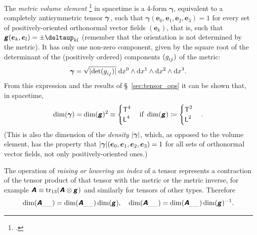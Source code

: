 \documentclass[\ifafour a4paper,12pt,\else a5paper,10pt,\fi%
onecolumn,oneside,article,%
british%
]{memoir}
\makeatletter
\theoremstyle{remark}
\theoremstyle{innote}
\newcommand*{\mathte}[1]{\textbf{\textit{\textsf{#1}}}}
\newcommand*{\citep}{\footcites}
\newcommand*{\delt}{\deltaup}%
\newcommand*{\di}{\mathrm{d}}%
\DeclareMathOperator{\tr}{tr}%
\newcommand*{\defd}{\coloneqq}
\DeclarePairedDelimiter\abs{\lvert}{\rvert}
\renewcommand*{\|}[1][]{\nonscript\,#1\vert\nonscript\;\mathopen{}}
\newcommand*{\sect}{\S}%
\newcommand*{\q}{}%
\DeclareRobustCommand*{\q}{%
  \mathbin{\mathpalette\bigcdot@{}}%
}
\newcommand*{\bigcdot@scalefactor}{0.75}
\newcommand*{\bigcdot@widthfactor}{1.5}
\newcommand*{\bigcdot@}[2]{%
  \sbox0{$#1\vcenter{}$}%
  \sbox2{$#1\cdot\m@th$}%
  \hbox to \bigcdot@widthfactor\wd2{%
    \hfil
    \raise\ht0\hbox{%
      \scalebox{\bigcdot@scalefactor}{%
        \lower\ht0\hbox{$#1\bullet\m@th$}%
      }%
    }%
    \hfil
  }%
}
\newcommand*{\Le}{\textsf{L}}
\newcommand*{\Ti}{\textsf{T}}
\newcommand*{\yA}{\mathte{A}}
\newcommand*{\yg}{\mathte{g}}
\renewcommand*{\i}{\indices}
\newcommand*{\dix}[1][i]{\di x^{#1}}
\newcommand*{\ye}{\bm{e}}
\newcommand*{\ygv}{\bm{\gamma}}
\makeatother
\begin{document}
\medskip

The \emph{metric volume element} \citep[\sect~6.2]{abrahametal1983_r1988}
in spacetime is a 4-form $\ygv$, equivalent to a completely antisymmetric
tensor $\ygv\i{_{\q\q\q\q}}$, such that
$\ygv(\ye_{0},\ye_{1},\ye_{2},\ye_{3})=1$ for every set of
positively-oriented orthonormal vector fields $(\ye_{k})$, that is, such
that $\yg(\ye_{k},\ye_{l})=\pm\delt_{kl}$ (remember that the orientation is
not determined by the metric). It has only one non-zero 
component, given by the square root of the determinant of the (positively
ordered) components $(g\i{_{ij}})$ of the metric:
\begin{equation}
  \label{eq:volume_elem}
  \ygv = \sqrt{\smash[b]{\abs{\det(g\i{_{ij}})}}}\;\dix[0]\land\dix[1]\land\dix[2]\land\dix[3].
\end{equation}
From this expression and the results of \sect~\ref{sec:tensor_ops} it can
be shown that, in spacetime,
\begin{equation}
  \label{eq:dim_volume_elem}
  \dim(\ygv) = \dim(\yg)^{2} \equiv
    \begin{cases}
    \Ti^{4} \\
    \Le^{4}
  \end{cases}
  \text{if }\dim(\yg)\defd
  \begin{cases}
     \Ti^2 \\
    \Le^2
  \end{cases}.
\end{equation}
(This is also the dimension of the \emph{density} $\abs{\ygv}$, which, as
opposed to the volume element, has the property that
$\abs{\ygv}(\ye_{0},\ye_{1},\ye_{2},\ye_{3})=1$ for all sets of orthonormal
vector fields, not only positively-oriented ones.)

\medskip

The operation of \emph{raising or lowering an index} of a tensor represents a
contraction of the tensor product of that tensor with the metric or the
metric inverse, for example
$\yA\i{_{\q\q}} \equiv
\tr_{13}(\yA\i{^{\q}_{\q}}\otimes\yg\i{_{\q\q}})$ and similarly
for tensors of other types. Therefore
\begin{equation}
  \label{eq:raising_lowering}
  \dim(\yA\i{_{\dotso}_{\q}_{\dotso}}) =
  \dim(\yA\i{_{\dotso}^{\q}_{\dotso}})\dim(\yg),
\quad
  \dim(\yA\i{_{\dotso}^{\q}_{\dotso}}) =
  \dim(\yA\i{_{\dotso}_{\q}_{\dotso}})\dim(\yg)^{-1}.
\end{equation}

\medskip
\end{document}
